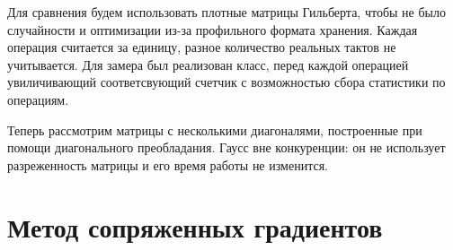 \documentclass[russian, english]{article}
\begin{document}
\begin{minipage}{\textwidth}
Для сравнения будем использовать плотные матрицы Гильберта, чтобы не было случайности и оптимизации из-за профильного формата хранения. Каждая операция считается за единицу, разное количество реальных тактов не учитывается. Для замера был реализован класс, перед каждой операцией увиличивающий соответсвующий счетчик с возможностью сбора статистики по операциям.

\end{minipage}

\begin{minipage}{\textwidth}
Теперь рассмотрим матрицы с несколькими диагоналями, построенные при помощи диагонального преобладания. Гаусс вне конкуренции: он не использует разреженность матрицы и его время работы не изменится.

\end{minipage}

\section{Метод сопряженных градиентов}
\end{document}
